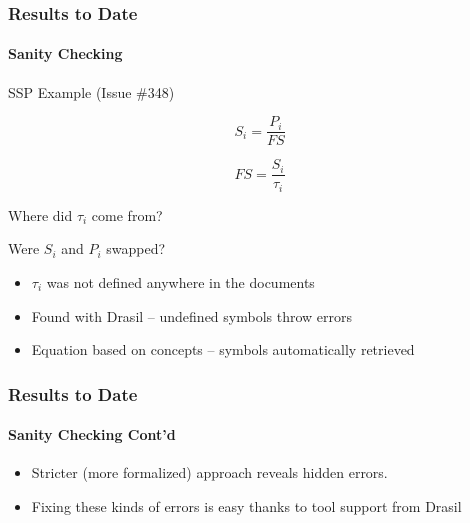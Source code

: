 \documentclass{beamer}
\begin{document}

\begin{frame}[fragile]

\frametitle{Results to Date} %
\framesubtitle{Sanity Checking}

SSP Example (Issue \#348)

\begin{minipage}{.4\linewidth}
\begin{equation}
S_i = \frac{P_i}{FS}
\end{equation}
\end{minipage}%
\begin{minipage}{.4\linewidth}
\begin{equation}
FS = \frac{S_i}{\tau{}_i}
\end{equation}
\end{minipage}

\vspace{.5cm}Where did $\tau{}_i$ come from?\vspace{.3cm}

Were $S_i$ and $P_i$ swapped?


\begin{itemize}
\item $\tau{}_i$ was not defined anywhere in the documents
\item Found with Drasil -- undefined symbols throw errors
\item Equation based on concepts -- symbols automatically retrieved
\end{itemize}


\end{frame}


\begin{frame}[fragile]

\frametitle{Results to Date} %
\framesubtitle{Sanity Checking Cont'd}

\begin{itemize}
\item Stricter (more formalized) approach reveals hidden errors.

\item Fixing these kinds of errors is easy thanks to tool support from Drasil
\end{itemize}

\end{frame}
\end{document}
